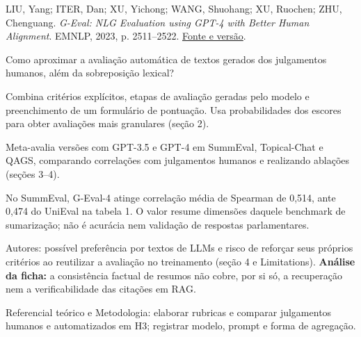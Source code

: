 {\small LIU, Yang; ITER, Dan; XU, Yichong; WANG, Shuohang; XU, Ruochen; ZHU, Chenguang. \textit{G-Eval: NLG Evaluation using GPT-4 with Better Human Alignment}. EMNLP, 2023, p. 2511--2522. \href{https://aclanthology.org/2023.emnlp-main.153/}{Fonte e versão}.\par}

Como aproximar a avaliação automática de textos gerados dos julgamentos humanos, além da sobreposição lexical?

Combina critérios explícitos, etapas de avaliação geradas pelo modelo e preenchimento de um formulário de pontuação. Usa probabilidades dos escores para obter avaliações mais granulares (seção 2).

Meta-avalia versões com GPT-3.5 e GPT-4 em SummEval, Topical-Chat e QAGS, comparando correlações com julgamentos humanos e realizando ablações (seções 3--4).

No SummEval, G-Eval-4 atinge correlação média de Spearman de 0,514, ante 0,474 do UniEval na tabela 1. O valor resume dimensões daquele benchmark de sumarização; não é acurácia nem validação de respostas parlamentares.

\begin{itemize}
\end{itemize}

Autores: possível preferência por textos de LLMs e risco de reforçar seus próprios critérios ao reutilizar a avaliação no treinamento (seção 4 e Limitations). \textbf{Análise da ficha:} a consistência factual de resumos não cobre, por si só, a recuperação nem a verificabilidade das citações em RAG.

Referencial teórico e Metodologia: elaborar rubricas e comparar julgamentos humanos e automatizados em H3; registrar modelo, prompt e forma de agregação.

